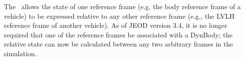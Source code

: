 %
%
% 
%


The \RelativeDesc\ allows the state of one reference frame (e.g. the body reference frame of a vehicle) to be expressed relative to any other reference frame (e.g., the LVLH reference frame of another vehicle). As of JEOD version 3.4, it is no longer required that one of the reference frames be associated with a DynBody; the relative state can now be calculated between any two arbitrary frames in the simulation.













